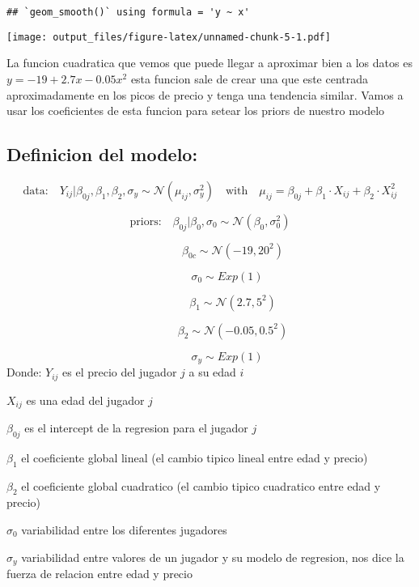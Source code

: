 \documentclass[
]{article}
\begin{document}
\begin{verbatim}
## `geom_smooth()` using formula = 'y ~ x'
\end{verbatim}

\texttt{[image: output\_files/figure-latex/unnamed-chunk-5-1.pdf]}

La funcion cuadratica que vemos que puede llegar a aproximar bien a los
datos es \(y = -19 + 2.7x -0.05 x^2\) esta funcion sale de crear una que
este centrada aproximadamente en los picos de precio y tenga una
tendencia similar. Vamos a usar los coeficientes de esta funcion para
setear los priors de nuestro modelo

\subsection{Definicion del modelo:}\label{definicion-del-modelo}

\[
\text{data:} \quad Y_{{ij}}|\beta_{0j}, \beta_{1}, \beta_{2} ,\sigma_{y} \sim \mathcal{{N}}(\mu_{{ij}}, \sigma_{y}^{2}) \quad  \text{with} \quad  \mu_{{ij}} = \beta_{{0j}} + \beta_{{1}} \cdot X_{{ij}} + \beta_{{2}} \cdot X_{ij}^{2}
\]

\[
\text{priors:} \quad \beta_{0j}|\beta_{0},\sigma_{0} \sim \mathcal{{N}}(\beta_{0}, \sigma_{0}^{{2}})
\]

\[
\quad \quad \quad \quad \beta_{0c} \sim \mathcal{{N}}(-19, 20^2)
\]

\[
\quad \quad \quad \sigma_{0} \sim Exp(1)
\]

\[
\quad \quad \quad \quad \beta_{{1}} \sim \mathcal{{N}}(2.7, 5^{{2}})
\]

\[
\quad \quad \quad \quad \beta_{{2}} \sim \mathcal{{N}}(-0.05, 0.5^{{2}})
\]

\[
\quad \quad \quad \sigma_{y} \sim Exp(1)
\] Donde: \(Y_{ij}\) es el precio del jugador \(j\) a su edad \(i\)

\(X_{ij}\) es una edad del jugador \(j\)

\(\beta_{0j}\) es el intercept de la regresion para el jugador \(j\)

\(\beta_{1}\) el coeficiente global lineal (el cambio tipico lineal
entre edad y precio)

\(\beta_{2}\) el coeficiente global cuadratico (el cambio tipico
cuadratico entre edad y precio)

\(\sigma_{0}\) variabilidad entre los diferentes jugadores

\(\sigma_{y}\) variabilidad entre valores de un jugador y su modelo de
regresion, nos dice la fuerza de relacion entre edad y precio
\end{document}
